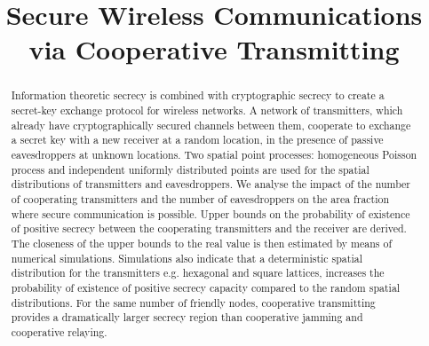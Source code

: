 \documentclass[conference,a4paper]{IEEEtran}
\begin{document}
\sloppy

\title{Secure Wireless Communications via Cooperative Transmitting} 


\author{
  \and
}









\maketitle

\begin{abstract}
Information theoretic secrecy is combined with cryptographic secrecy to create a secret-key exchange protocol for wireless networks.
A network of transmitters, which already have cryptographically secured channels between them, cooperate to exchange a secret key with a new receiver at a random location, in the presence of passive eavesdroppers at unknown locations.
Two spatial point processes: homogeneous Poisson process and independent uniformly distributed points are used for the spatial distributions of transmitters and eavesdroppers.
We analyse the impact of the number of cooperating transmitters and the number of eavesdroppers on the area fraction where secure communication is possible.
Upper bounds on the probability of existence of positive secrecy between the cooperating transmitters and the receiver are derived.
The closeness of the upper bounds to the real value is then estimated by means of numerical simulations.
Simulations also indicate that a deterministic spatial distribution for the transmitters e.g. hexagonal and square lattices, increases the probability of existence of positive secrecy capacity compared to the random spatial distributions.
For the same number of friendly nodes, cooperative transmitting provides a  dramatically larger secrecy region than cooperative jamming and cooperative relaying.
\end{abstract}
\end{document}
